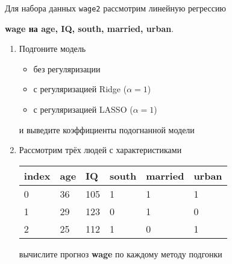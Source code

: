 \begin{exercise}
Для набора данных \texttt{wage2} рассмотрим линейную регрессию 
\begin{center}
	\textbf{wage на age, IQ, south, married, urban}.
\end{center}
\begin{enumerate}
	\item Подгоните модель
	\begin{itemize}
		\item без регуляризации
		\item с регуляризацией Ridge (\(\alpha=1\))
		\item с регуляризацией LASSO (\(\alpha=1\))
	\end{itemize}
	и выведите коэффициенты подогнанной модели
	\item Рассмотрим трёх людей с характеристиками
	\begin{center}
		\begin{tabular}{|l||l|l|l|l|l|}\hline
			index & age & IQ & south & married & urban \\ \hline\hline
			0 & 36 & 105 & 1 & 1 & 1 \\
			1 & 29 & 123 & 0 & 1 & 0 \\
			2 & 25 & 112 & 1 & 0 & 1 \\ \hline
		\end{tabular}
	\end{center}
	вычислите прогноз \textbf{wage} по каждому методу подгонки
\end{enumerate}
\end{exercise}

